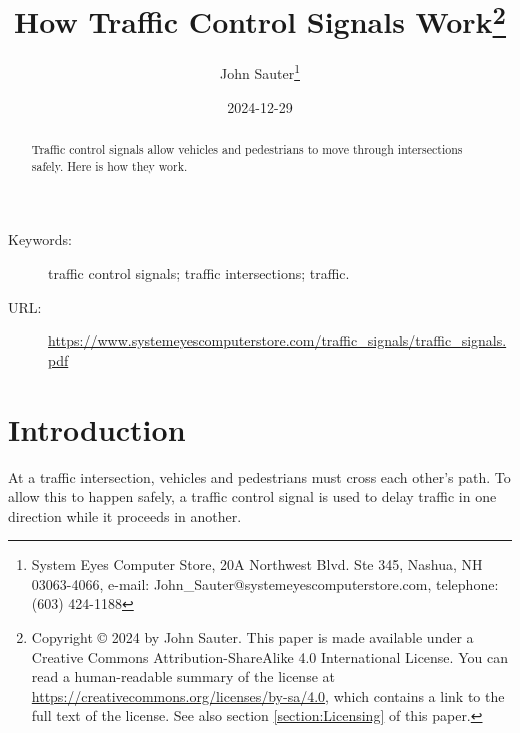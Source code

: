 \documentclass[letterpaper,twoside]{article}
\begin{document}
\title{How Traffic Control Signals Work\footnote{Copyright
    {\copyright} 2024 by John Sauter.
    This paper is made available under a
    Creative Commons Attribution-ShareAlike 4.0 International License.
    You can read a human-readable summary of the license at
    \href{https://creativecommons.org/licenses/by-sa/4.0}{https://creativecommons.org/licenses/by-sa/4.0},
    which contains a link to the full text of the license.
    See also section \ref{section:Licensing} of this paper.}
}
\author{John Sauter\footnote{
    System Eyes Computer Store,
    20A Northwest Blvd.  Ste 345,
    Nashua, NH  03063-4066,
    e-mail: John\_Sauter@systemeyescomputerstore.com,
    telephone: (603) 424-1188}}

\date{2024-12-29}
\maketitle
\begin{abstract}
  Traffic control signals allow vehicles and pedestrians to move through
  intersections safely.  Here is how they work.
\end{abstract}
\begin{description}
\item[Keywords:]traffic control signals; traffic intersections; traffic.
\item[URL:]\href{https://www.systemeyescomputerstore.com/traffic\_signals/traffic\_signalst.pdf}{https://www.systemeyescomputerstore.com/traffic\_signals/traffic\_signals.pdf}
\end{description}
\newpage

\section{Introduction}
At a traffic intersection, vehicles and pedestrians must cross each other's
path.  To allow this to happen safely, a traffic control signal is used to
delay traffic in one direction while it proceeds in another.
\end{document}
